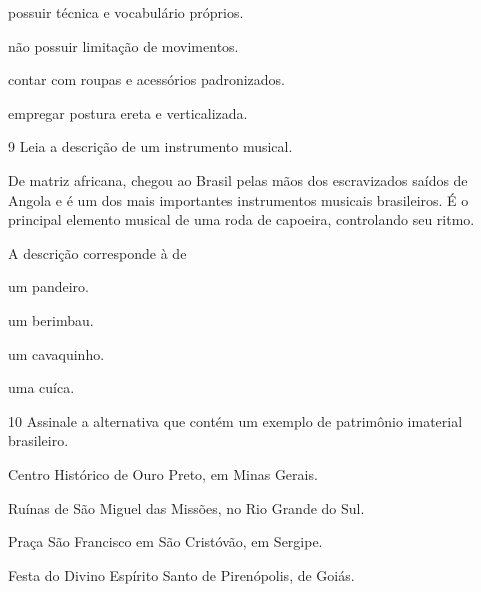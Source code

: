 \begin{minipage}{.5\textwidth}
\begin{escolha}
\item
  possuir técnica e vocabulário próprios.
\item
  não possuir limitação de movimentos.
\item
  contar com roupas e acessórios padronizados.
\item
  empregar postura ereta e verticalizada.
\end{escolha}
\end{minipage}

\num{9}  Leia a descrição de um instrumento musical.

De matriz africana, chegou ao Brasil pelas mãos dos escravizados saídos de Angola
e é um dos mais importantes instrumentos musicais brasileiros. É o principal
elemento musical de uma roda de capoeira, controlando seu ritmo.

A descrição corresponde à de

\begin{minipage}{.5\textwidth}
\begin{escolha}
\item
  um pandeiro.
\item
  um berimbau.
\item
  um cavaquinho.
\item
  uma cuíca.
\end{escolha}
\end{minipage}

\num{10} Assinale a alternativa que contém um exemplo de patrimônio imaterial brasileiro.

\begin{escolha}
\item
  Centro Histórico de Ouro Preto, em Minas Gerais.
\item
  Ruínas de São Miguel das Missões, no Rio Grande do Sul.
\item
  Praça São Francisco em São Cristóvão, em Sergipe.
\item
  Festa do Divino Espírito Santo de Pirenópolis, de Goiás.
\end{escolha}

